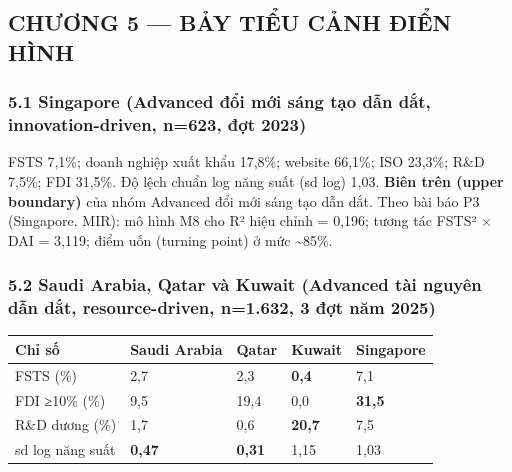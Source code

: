 \documentclass[12pt,a4paper]{article}
\begin{document}
\hypertarget{chux1b0ux1a1ng-5--bux1ea3y-tiux1ec3u-cux1ea3nh-ux111iux1ec3n-huxecnh}{%
\subsection{CHƯƠNG 5 --- BẢY TIỂU CẢNH ĐIỂN
HÌNH}\label{chux1b0ux1a1ng-5--bux1ea3y-tiux1ec3u-cux1ea3nh-ux111iux1ec3n-huxecnh}}

\hypertarget{51-singapore-advanced-ux111ux1ed5i-mux1edbi-suxe1ng-tux1ea1o-dux1eabn-dux1eaft-innovation-driven-n623-ux111ux1ee3t-2023}{%
\subsubsection{5.1 Singapore (Advanced đổi mới sáng tạo dẫn dắt,
innovation-driven, n=623, đợt
2023)}\label{51-singapore-advanced-ux111ux1ed5i-mux1edbi-suxe1ng-tux1ea1o-dux1eabn-dux1eaft-innovation-driven-n623-ux111ux1ee3t-2023}}

FSTS 7,1\%; doanh nghiệp xuất khẩu 17,8\%; website 66,1\%; ISO 23,3\%;
R\&D 7,5\%; FDI 31,5\%. Độ lệch chuẩn log năng suất (sd log) 1,03.
\textbf{Biên trên (upper boundary)} của nhóm Advanced đổi mới sáng tạo
dẫn dắt. Theo bài báo P3 (Singapore. MIR): mô hình M8 cho R² hiệu chỉnh
= 0,196; tương tác FSTS² × DAI = 3,119; điểm uốn (turning point) ở mức
\textasciitilde85\%.

\hypertarget{52-saudi-arabia-qatar-vuxe0-kuwait-advanced-tuxe0i-nguyuxean-dux1eabn-dux1eaft-resource-driven-n1632-3-ux111ux1ee3t-nux103m-2025}{%
\subsubsection{5.2 Saudi Arabia, Qatar và Kuwait (Advanced tài nguyên
dẫn dắt, resource-driven, n=1.632, 3 đợt năm
2025)}\label{52-saudi-arabia-qatar-vuxe0-kuwait-advanced-tuxe0i-nguyuxean-dux1eabn-dux1eaft-resource-driven-n1632-3-ux111ux1ee3t-nux103m-2025}}

\begin{longtable}[]{@{}lllll@{}}
\toprule\noalign{}
Chỉ số & Saudi Arabia & Qatar & Kuwait & Singapore \\
\midrule\noalign{}
\endhead
\bottomrule\noalign{}
\endlastfoot
FSTS (\%) & 2,7 & 2,3 & \textbf{0,4} & 7,1 \\
FDI ≥10\% (\%) & 9,5 & 19,4 & 0,0 & \textbf{31,5} \\
R\&D dương (\%) & 1,7 & 0,6 & \textbf{20,7} & 7,5 \\
sd log năng suất & \textbf{0,47} & \textbf{0,31} & 1,15 & 1,03 \\
\end{longtable}
\end{document}
